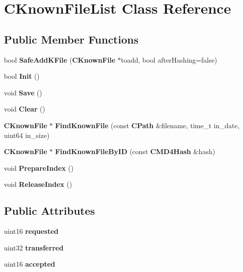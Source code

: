 \section{CKnownFileList Class Reference}
\label{classCKnownFileList}
\subsection*{Public Member Functions}
\begin{DoxyCompactItemize}
\item 
bool {\bfseries SafeAddKFile} ({\bf CKnownFile} $\ast$toadd, bool afterHashing=false)\label{classCKnownFileList_a5142a1bac3539b92275ed81e3ab48cca}

\item 
bool {\bfseries Init} ()\label{classCKnownFileList_a0e053d99262c4a7112540f6166ce32c1}

\item 
void {\bfseries Save} ()\label{classCKnownFileList_afe7c9799bda3246c27f172e2fea1d584}

\item 
void {\bfseries Clear} ()\label{classCKnownFileList_a9aef9e7f576717897754f2ad1e6aab45}

\item 
{\bf CKnownFile} $\ast$ {\bfseries FindKnownFile} (const {\bf CPath} \&filename, time\_\-t in\_\-date, uint64 in\_\-size)\label{classCKnownFileList_a6d5ef01539339b1206b01ba48b5d8e59}

\item 
{\bf CKnownFile} $\ast$ {\bfseries FindKnownFileByID} (const {\bf CMD4Hash} \&hash)\label{classCKnownFileList_aae75a8121e65592ffe1559a17941fe96}

\item 
void {\bfseries PrepareIndex} ()\label{classCKnownFileList_ab2727097a84dabff8ef6a23553c2b8a7}

\item 
void {\bfseries ReleaseIndex} ()\label{classCKnownFileList_a847aab7ad6032c9f2e86f2390e97cfe1}

\end{DoxyCompactItemize}
\subsection*{Public Attributes}
\begin{DoxyCompactItemize}
\item 
uint16 {\bfseries requested}\label{classCKnownFileList_a287be5fd5394753fd019047332160981}

\item 
uint32 {\bfseries transferred}\label{classCKnownFileList_a24c7034a0a0e1bc99a4706960f30b921}

\item 
uint16 {\bfseries accepted}\label{classCKnownFileList_a080a603663e4109bd876739a2cf97304}

\end{DoxyCompactItemize}
